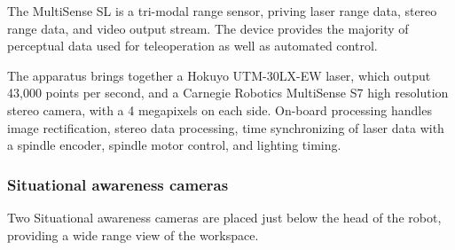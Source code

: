 \documentclass[12pt]{report}
\begin{document}
The MultiSense SL is a tri-modal range sensor, priving laser range data, stereo range data, and video output stream. The device provides the majority of perceptual data used for teleoperation as well as automated control. 

The apparatus brings together a Hokuyo UTM-30LX-EW laser, which output 43,000 points per second, and a Carnegie Robotics MultiSense S7 high resolution stereo camera, with a 4 megapixels on each side.  On-board processing handles image rectification, stereo data processing, time synchronizing of laser data with a spindle encoder, spindle motor control, and lighting timing. \cite{multisense-sl}

\subsubsection{Situational awareness cameras}

Two Situational awareness cameras are placed just below the head of the robot, providing a wide range view of the workspace.
\end{document}
